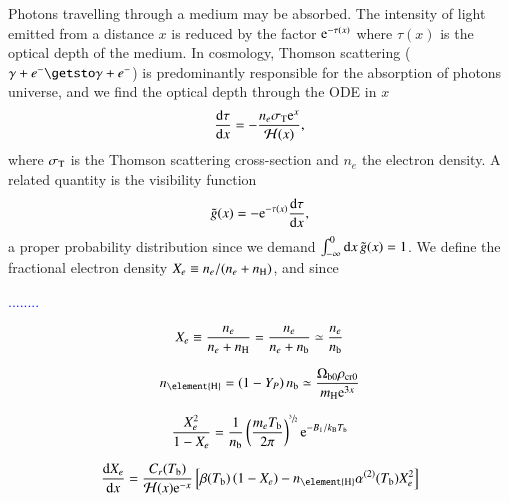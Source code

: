 
Photons travelling through a medium may be absorbed. The intensity of light emitted from a distance $x$ is reduced by the factor $\mathrm{e}^{-\tau(x)}$ where $\tau(x)$ is the optical depth of the medium. In cosmology, Thomson scattering ($\gamma + e^{-} \getsto \gamma+ e^{-}$) is predominantly responsible for the absorption of photons universe, and we find the optical depth through the ODE in $x$
\begin{equation}\label{mil2:theo:eq:ode_tau_of_x}
    \dv{\tau}{x} = - \frac{n_e \sigma_\mathrm{T}\mathrm{e}^{x}}{\mathcal{H}(x)},
\end{equation}
where $\sigma_\mathrm{T}$ is the Thomson scattering cross-section and $n_e$ the electron density. A related quantity is the visibility function
\begin{equation}\label{mil2:theo:eq:gt_of_x}
    \tilde{g}(x)= - \mathrm{e}^{-\tau(x)} \dv{\tau}{x},
\end{equation}
a proper probability distribution since we demand $\int_{-\infty}^{0}\mathrm{d} x\, \tilde{g}(x) = 1$. We define the fractional electron density $X_e\equiv  n_e/(n_e +n_\mathrm{H})$, and since

\textcolor{blue}{........}

\begin{equation}
    X_e \equiv \frac{n_e}{n_e +n_\mathrm{H}} = \frac{n_e}{n_e + n_\mathrm{b}} \simeq  \frac{n_e}{n_\mathrm{b}} 
\end{equation}

\begin{equation}
    n\ped{\element{H}} = \left(1-Y_P\right) n\ped{b} \simeq \frac{\Omega\ped{b0}\rho\ped{cr0}}{m\ped{H}\eu^{3x}}
\end{equation}

\begin{equation}\label{mil2:theo:eq:Saha}
    \frac{X_e^2}{1-X_e}= \frac{1}{n_\mathrm{b}}\left(\frac{m_e T_\mathrm{b}}{2\pi} \right)^{\sfrac{3}{2}} \mathrm{e}^{-B_1/k_\mathrm{B}T_\mathrm{b}}
\end{equation}

\begin{equation}\label{mil2:theo:eq:Peebles}
    \dv{X_e}{x} = \frac{C_r(T\ped{b})}{\Hp(x)\eu^{-x}} \left[ \beta(T\ped{b}) \left(1-X_e\right) - n\ped{\element{H}} \alpha^{(2)}(T\ped{b})X_e^2 \right]
\end{equation}

